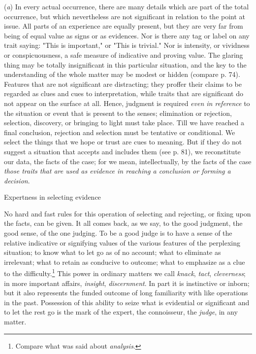 \documentclass[letterpaper]{book}
\begin{document}
(\emph{a}) In every actual occurrence, there are many details which are
part of the total occurrence, but which nevertheless are not significant
in relation to the point at issue. All parts of an experience are
equally present, but they are very far from being of equal value as
signs or as evidences. Nor is there any tag or label on any trait
saying: "This is important," or "This is trivial." Nor is intensity, or
vividness or conspicuousness, a safe measure of indicative and proving
value. The glaring thing may be totally insignificant in this particular
situation, and the key to the understanding of the whole matter may be
modest or hidden (compare p. 74). Features that are not significant are
distracting; they proffer their claims to be regarded as clues and cues
to interpretation, while traits that are significant do not appear on
the surface at all. Hence, judgment is required \emph{even in reference}
to the situation or event that is present to the senses; elimination or
rejection, selection, discovery, or bringing to light must take
place.
Till we have reached a final conclusion, rejection and selection must be
tentative or conditional. We select the things that we hope or trust are
cues to meaning. But if they do not suggest a situation that accepts and
includes them (see p. 81), we reconstitute our data, the facts of the
case; for we mean, intellectually, by the facts of the case \emph{those
traits that are used as evidence in reaching a conclusion or forming a
decision}.

Expertness in selecting evidence

No hard and fast rules for this operation of selecting and rejecting, or
fixing upon the facts, can be given. It all comes back, as we say, to
the good judgment, the good sense, of the one judging. To be a good
judge is to have a sense of the relative indicative or signifying values
of the various features of the perplexing situation; to know what to let
go as of no account; what to eliminate as irrelevant; what to retain as
conducive to outcome; what to emphasize as a clue to the
difficulty.\footnote{ Compare what was said about \emph{analysis}. }
This power in ordinary matters we call \emph{knack}, \emph{tact},
\emph{cleverness}; in more important affairs, \emph{insight},
\emph{discernment}. In part it is instinctive or inborn; but it also
represents the funded outcome of long familiarity with like operations
in the past. Possession of this ability to seize what is evidential or
significant and to let the rest go is the mark of the expert, the
connoisseur, the \emph{judge}, in any matter.
\end{document}
